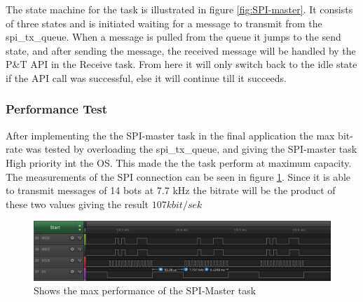 The state machine for the task is illustrated in figure \ref{fig:SPI-master}. It consists of three states and is initiated waiting for a message to transmit from the spi\_tx\_queue. When a message is pulled from the queue it jumps to the send state, and after sending the message, the received message will be handled by the P\&T API in the Receive task. From here it will only switch back to the idle state if the API call was successful, else it will continue till it succeeds. 


\subsubsection{Performance Test} 
\label{sec:PerformanceTest}
After implementing the the SPI-master task in the final application the max bit-rate was tested by overloading the spi\_tx\_queue, and giving the SPI-master task High priority int the OS. This made the the task perform at maximum capacity. The measurements of the SPI connection can be seen in figure \ref{fig:HightPerformance}. Since it is able to transmit messages of 14 bots at 7.7 kHz the bitrate will be the product of these two values giving the result $107 kbit/sek$


\begin{figure}
	\centering
	\includegraphics[scale = 0.7] {Billeder/HightPerformance}
	\caption{Shows the max performance of the SPI-Master task}
	\label{fig:HightPerformance}
\end{figure}
 

 